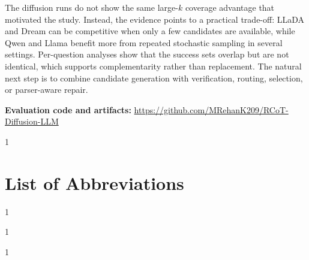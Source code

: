 \documentclass[12pt,a4paper,american,oneside]{scrartcl}
\begin{document}
The diffusion runs do not show the same large-$k$ coverage advantage that motivated the study. Instead, the evidence points to a practical trade-off: LLaDA and Dream can be competitive when only a few candidates are available, while Qwen and Llama benefit more from repeated stochastic sampling in several settings. Per-question analyses show that the success sets overlap but are not identical, which supports complementarity rather than replacement. The natural next step is to combine candidate generation with verification, routing, selection, or parser-aware repair.

\vfill
\noindent\footnotesize\textbf{Evaluation code and artifacts:} \url{https://github.com/MRehanK209/RCoT-Diffusion-LLM}
\cleardoublepage

\begin{spacing}{1}
\tableofcontents
\end{spacing}
\clearpage

{}
\section*{List of Abbreviations}
\begin{spacing}{1}

\end{spacing}
\clearpage

\begin{spacing}{1}
\renewcommand{\listfigurename}{List of Figures}
{}
\listoffigures
\end{spacing}
\clearpage

\begin{spacing}{1}
\renewcommand{\listtablename}{List of Tables}
{}
\listoftables
\end{spacing}
\clearpage

\setcounter{pageCounter}{\value{page}}


\end{document}
